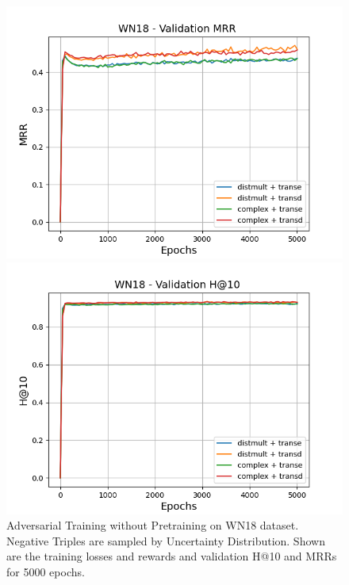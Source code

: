 \begin{figure}
    \begin{minipage}{.5\textwidth}
      \centering
      \includegraphics[width=0.9\linewidth]{figures/results/gan_train/not_pretrained/uncertainty/max_distribution/entropy/wn18/gan_train_uncertainty_wn18_mrrs.png}
    \end{minipage}%
    \begin{minipage}{.5\textwidth}
      \centering
      \includegraphics[width=0.9\linewidth]{figures/results/gan_train/not_pretrained/uncertainty/max_distribution/entropy/wn18/gan_train_uncertainty_wn18_hit10s.png}
    \end{minipage}%
    \caption{Adversarial Training without Pretraining on \textsc{WN18} dataset. 
    Negative Triples are sampled by Uncertainty Distribution.
    Shown are the training losses and rewards and validation H@10 and MRRs for 5000 epochs.}
    \label{fig:advtrain_not_pretrained_wn18_pretrained}
\end{figure}






